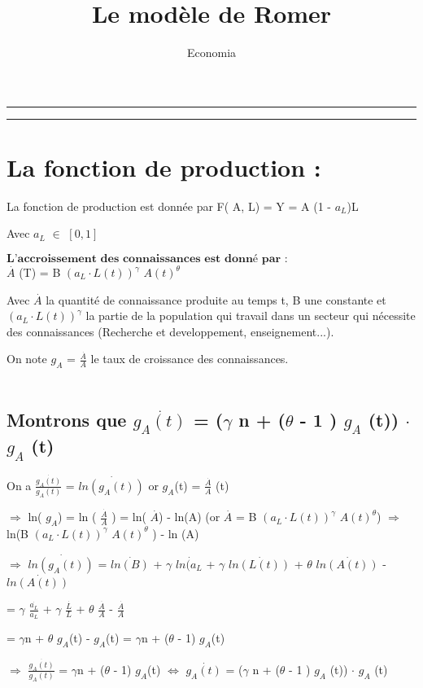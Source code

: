 \documentclass{article}
\title{Le modèle de Romer}
\author{Economia}
\date{}
\makeatletter
\def\maketitle{%
    \begin{center}\leavevmode
        \normalfont
        \rule[0pt]{\textwidth}{1pt}\par
        {\LARGE \@title\par}%
        {\Large \@author\par}%
        {\Large \@date\par}%
        \rule[0pt]{\textwidth}{1pt}\par
    \end{center}%
}
\makeatother
\begin{document}
\maketitle
\section{La fonction de production :}

La fonction de production est donnée par F( A, L) = Y = A (1 - $a_{L}$)L

Avec $a_{L}$ $\in$ $[0 , 1]$

$\textbf{L'accroissement des connaissances est donné par : }$ 
\\
$\stackrel{.}{A}$ (T) = B ${(a_{L} \cdot L(t))}^{\gamma}$ ${A(t)^{\theta}}$

Avec $\stackrel{.}{A}$ la quantité de connaissance produite au temps t, B une constante et ${(a_{L} \cdot L(t))}^{\gamma}$ la partie de la population qui travail dans un secteur qui nécessite des connaissances (Recherche et developpement, enseignement...).

On note $g_{A}$ = $\frac{\stackrel{.}{A}}{A}$ le taux de croissance des connaissances.
\\\\
\subsection{Montrons que $\stackrel{.}{g_{A} (t)}$ = ($\gamma$ n + ($\theta$ - 1 ) $g_{A}$ (t)) $\cdot$ $g_{A}$ (t) }
On a $\frac{\stackrel{.}{g_{A}(t)}}{g_{A}(t)}$ = $\stackrel{.}{ln(g_{A} (t))}$ or $g_{A}$(t) = $\frac{\stackrel{.}{A}}{A}$ (t)

$\Rightarrow$ ln( $g_{A}$) = ln ( $\frac{\stackrel{.}{A}}{A}$ ) =  ln( $\stackrel{.}{A}$) - ln(A) (or $\stackrel{.}{A}$ = B ${(a_{L} \cdot L(t))}^{\gamma}$ ${A(t)^{\theta}}$) $\Rightarrow$ ln(B ${(a_{L} \cdot L(t))}^{\gamma}$ ${A(t)^{\theta}}$ ) - ln (A)

$\Rightarrow$ $\stackrel{.}{ln(g_{A} (t))}$ = $\stackrel{.}{ln(B)}$ + $\gamma$ $\stackrel{.}{ln (a_{L}}$ + $\gamma$ $\stackrel{.}{ln (L(t))}$ + $\theta$ $\stackrel{.}{ln(A(t))}$ - $\stackrel{.}{ln(A(t))}$ 

= $\gamma$ $\frac{\stackrel{.}{a_{L}}}{a_{L}}$ + $\gamma$ $\frac{\stackrel{.}{L}}{L}$ + $\theta$ $\frac{\stackrel{.}{A}}{A}$ - $\frac{\stackrel{.}{A}}{A}$

= $\gamma$n + $\theta$ $g_{A}$(t) - $g_{A}$(t) = $\gamma$n + ($\theta$ - 1) $g_{A}$(t)

$\Rightarrow$ $\frac{\stackrel{.}{g_{A}(t)}}{g_{A}(t)}$ = $\gamma$n + ($\theta$ - 1) $g_{A}$(t) $\Leftrightarrow$ $\stackrel{.}{g_{A}(t)}$ = ($\gamma$ n + ($\theta$ - 1 ) $g_{A}$ (t)) $\cdot$ $g_{A}$ (t)
\end{document}
